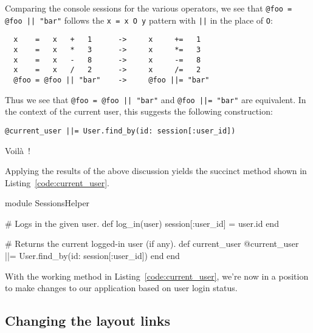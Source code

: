 \begin{aside}
Comparing the console sessions for the various operators, we see that \texttt{@foo = @foo || "bar"} follows the \texttt{x = x O y} pattern with \texttt{||} in the place of \texttt{O}:

\begin{verbatim}
  x    =   x   +   1      ->     x     +=   1
  x    =   x   *   3      ->     x     *=   3
  x    =   x   -   8      ->     x     -=   8
  x    =   x   /   2      ->     x     /=   2
  @foo = @foo || "bar"    ->     @foo ||= "bar"
\end{verbatim}


\noindent Thus we see that \verb+@foo = @foo || "bar"+ and \verb+@foo ||= "bar"+ are equivalent. In the context of the current user, this suggests the following construction:

\begin{verbatim}
@current_user ||= User.find_by(id: session[:user_id])
\end{verbatim}

\noindent Voil\`{a}~!

\end{aside}

Applying the results of the above discussion yields the succinct \linebreak {} method shown in Listing~\ref{code:current_user}.

\begin{codelisting}
\label{code:current_user}
\begin{code}
module SessionsHelper

  # Logs in the given user.
  def log_in(user)
    session[:user_id] = user.id
  end

  # Returns the current logged-in user (if any).
  def current_user
    @current_user ||= User.find_by(id: session[:user_id])
  end
end
\end{code}
\end{codelisting}

\noindent With the working  method in Listing~\ref{code:current_user}, we're now in a position to make changes to our application based on user login status.


    \subsection{Changing the layout links} %
    \label{sec:changing_the_layout_links}

